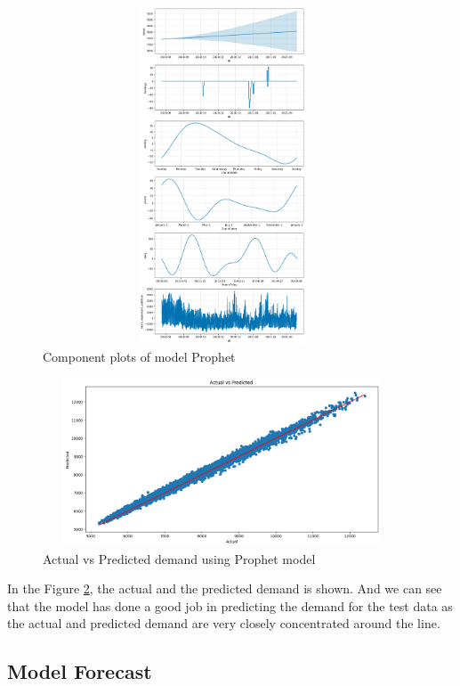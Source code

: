 \documentclass[mstat,12pt]{unswthesis}
\begin{document}
\begin{figure}[H]
\centering
\includegraphics[width=0.95\textwidth, height=10cm]{prophet_component_plot.png}
\caption{Component plots of model Prophet}\label{prophet_component_plot}
\end{figure}

\begin{figure}[H]
\centering
\includegraphics[width=0.95\textwidth, height=5cm]{prophet_actual_predict.png}
\caption{Actual vs Predicted demand using Prophet model}\label{prophet_actual}
\end{figure}

In the Figure \ref{prophet_actual}, the actual and the predicted demand
is shown. And we can see that the model has done a good job in
predicting the demand for the test data as the actual and predicted
demand are very closely concentrated around the line.

\subsection{Model Forecast}\label{model-forecast}
\end{document}
